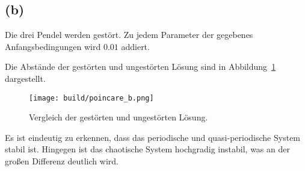 \documentclass{scrartcl}
\begin{document}
\subsection*{(b)}
Die drei Pendel werden gest\"ort.
Zu jedem Parameter der gegebenes Anfangsbedingungen wird $0.01$ addiert.

Die Abst\"ande der gest\"orten und ungest\"orten L\"osung sind in Abbildung~\ref{fig:2b}
dargestellt.
\begin{figure}[ht]
  \centering
  \texttt{[image: build/poincare\_b.png]}
  \caption{Vergleich der gest\"orten und ungest\"orten L\"osung.}%
  \label{fig:2b}
\end{figure}

Es ist eindeutig zu erkennen, dass das periodische und quasi-periodische System stabil ist.
Hingegen ist das chaotische System hochgradig instabil, was an der gro{\ss}en Differenz deutlich
wird.
\end{document}

